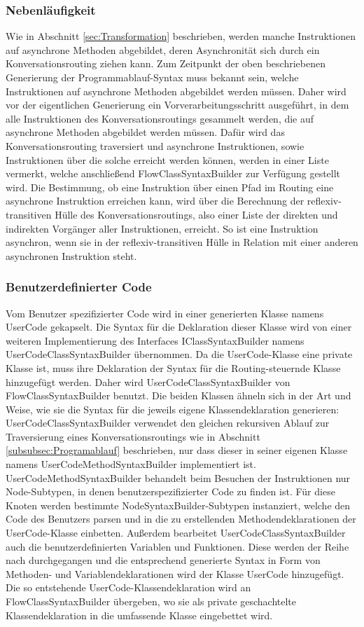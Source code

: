 \subsubsection{Nebenläufigkeit}
\label{subsubsec:Nebenlaeufigkeit}
Wie in Abschnitt \ref{sec:Transformation} beschrieben, werden manche Instruktionen auf asynchrone Methoden abgebildet, deren Asynchronität sich durch ein Konversationsrouting ziehen kann. Zum Zeitpunkt der oben beschriebenen Generierung der Programmablauf-Syntax muss bekannt sein, welche Instruktionen auf asynchrone Methoden abgebildet werden müssen. Daher wird vor der eigentlichen Generierung ein Vorverarbeitungsschritt ausgeführt, in dem alle Instruktionen des Konversationsroutings gesammelt werden, die auf asynchrone Methoden abgebildet werden müssen. Dafür wird das Konversationsrouting traversiert und asynchrone Instruktionen, sowie Instruktionen über die solche erreicht werden können, werden in einer Liste vermerkt, welche anschließend FlowClassSyntaxBuilder zur Verfügung gestellt wird. Die Bestimmung, ob eine Instruktion über einen Pfad im Routing eine asynchrone Instruktion erreichen kann, wird über die Berechnung der reflexiv-transitiven Hülle des Konversationsroutings, also einer Liste der direkten und indirekten Vorgänger aller Instruktionen, erreicht. So ist eine Instruktion asynchron, wenn sie in der reflexiv-transitiven Hülle in Relation mit einer anderen asynchronen Instruktion steht.

\subsubsection{Benutzerdefinierter Code}
Vom Benutzer spezifizierter Code wird in einer generierten Klasse namens UserCode gekapselt. Die Syntax für die Deklaration dieser Klasse wird von einer weiteren Implementierung des Interfaces IClassSyntaxBuilder namens UserCodeClassSyntaxBuilder übernommen. Da die UserCode-Klasse eine private Klasse ist, muss ihre Deklaration der Syntax für die Routing-steuernde Klasse hinzugefügt werden. Daher wird UserCodeClassSyntaxBuilder von FlowClassSyntaxBuilder benutzt. Die beiden Klassen ähneln sich in der Art und Weise, wie sie die Syntax für die jeweils eigene Klassendeklaration generieren: UserCodeClassSyntaxBuilder verwendet den gleichen rekursiven Ablauf zur Traversierung eines Konversationsroutings wie in Abschnitt \ref{subsubsec:Programablauf} beschrieben, nur dass dieser in seiner eigenen Klasse namens UserCodeMethodSyntaxBuilder implementiert ist. UserCodeMethodSyntaxBuilder behandelt beim Besuchen der Instruktionen nur Node-Subtypen, in denen benutzerspezifizierter Code zu finden ist. Für diese Knoten werden bestimmte NodeSyntaxBuilder-Subtypen instanziert, welche den Code des Benutzers parsen und in die zu erstellenden Methodendeklarationen der UserCode-Klasse einbetten. Außerdem bearbeitet UserCodeClassSyntaxBuilder auch die benutzerdefinierten Variablen und Funktionen. Diese werden der Reihe nach durchgegangen und die entsprechend generierte Syntax in Form von Methoden- und Variablendeklarationen wird der Klasse UserCode hinzugefügt. Die so entstehende UserCode-Klassendeklaration wird an FlowClassSyntaxBuilder übergeben, wo sie als private geschachtelte Klassendeklaration in die umfassende Klasse eingebettet wird.

